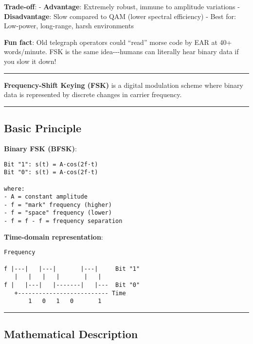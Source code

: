 \textbf{Trade-off}: - \textbf{Advantage}: Extremely robust, immune to
amplitude variations - \textbf{Disadvantage}: Slow compared to QAM
(lower spectral efficiency) - Best for: Low-power, long-range, harsh
environments

\textbf{Fun fact}: Old telegraph operators could ``read'' morse code by
EAR at 40+ words/minute. FSK is the same idea-\/-\/-humans can literally
hear binary data if you slow it down!

\begin{center}\rule{0.5\linewidth}{0.5pt}\end{center}

\textbf{Frequency-Shift Keying (FSK)} is a digital modulation scheme
where binary data is represented by discrete changes in carrier
frequency.

\begin{center}\rule{0.5\linewidth}{0.5pt}\end{center}

\subsection{\texorpdfstring{ Basic
Principle}{ Basic Principle}}\label{basic-principle}

\textbf{Binary FSK (BFSK)}:

\begin{verbatim}
Bit "1": s(t) = A·cos(2f·t)
Bit "0": s(t) = A·cos(2f·t)

where:
- A = constant amplitude
- f = "mark" frequency (higher)
- f = "space" frequency (lower)
- f = f - f = frequency separation
\end{verbatim}

\textbf{Time-domain representation}:

\begin{verbatim}
Frequency
   
f |---|   |---|       |---|     Bit "1"
   |   |   |   |       |   |
f |   |---|   |-------|   |---  Bit "0"
   +-------------------------- Time
       1   0   1   0       1
\end{verbatim}

\begin{center}\rule{0.5\linewidth}{0.5pt}\end{center}

\subsection{\texorpdfstring{ Mathematical
Description}{ Mathematical Description}}\label{mathematical-description}

